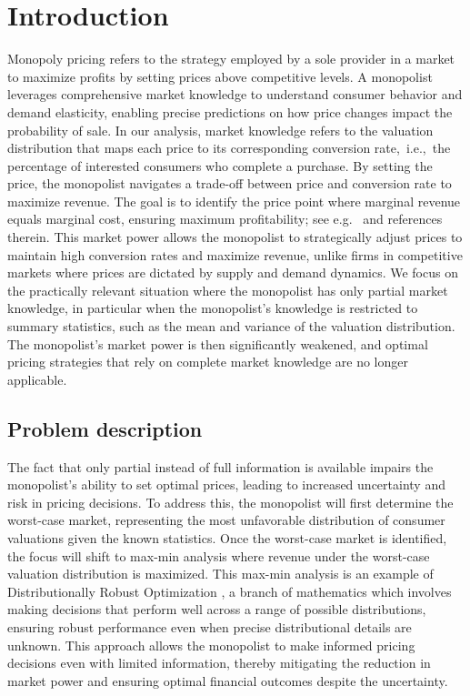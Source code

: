 \documentclass[11pt]{article}
\newcommand{\1}{\mathds{1}}
\begin{document}
\section{Introduction}
Monopoly pricing refers to the strategy employed by a sole provider in a market to maximize profits by setting prices above competitive levels. A monopolist leverages comprehensive market knowledge to understand consumer behavior and demand elasticity, enabling precise predictions on how price changes impact the probability of sale. In our analysis, market knowledge refers to the valuation distribution that maps each price to its corresponding conversion rate,~i.e.,~the percentage of interested consumers who complete a purchase. By setting the price, the monopolist navigates a trade-off between price and conversion rate to maximize revenue. The goal is to identify the price point where marginal revenue equals marginal cost, ensuring maximum profitability; see e.g.~\citep{loertscher2022monopoly,LOERTSCHER2024103081,weber2024monopoly} and references therein.
This market power allows the monopolist to strategically adjust prices to maintain high conversion rates and maximize revenue, unlike firms in competitive markets where prices are dictated by supply and demand dynamics. We focus on the practically relevant situation where the monopolist has only partial market knowledge, in particular when the monopolist's knowledge is restricted to summary statistics, such as the mean and variance of the valuation distribution. The monopolist’s market power is then significantly weakened, and optimal pricing strategies that rely on complete market knowledge are no longer applicable.

\subsection{Problem description}
The fact that only partial instead of full information is available impairs the monopolist's ability to set optimal prices, leading to increased uncertainty and risk in pricing decisions. To address this, the monopolist will first determine the worst-case market, representing the most unfavorable distribution of consumer valuations given the known statistics. Once the worst-case market is identified, the focus will shift to max-min analysis where revenue under the worst-case valuation distribution is maximized. This max-min analysis is an example of Distributionally Robust Optimization {\citep{Scarf1958,rahimian2019distributionally}}, a branch of mathematics which involves making decisions that perform well across a range of possible distributions, ensuring robust performance even when precise distributional details are unknown. This approach allows the monopolist to make informed pricing decisions even with limited information, thereby mitigating the reduction in market power and ensuring optimal financial outcomes despite the uncertainty.
\end{document}
